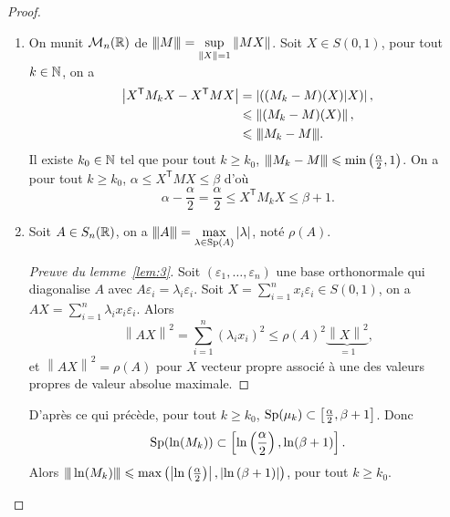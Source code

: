 \documentclass[12pt]{article}
\begin{document}
\begin{proof}
\begin{enumerate}
		\item On munit $\mathcal{M}_n(\mathbb{R})$ de ${\left\vert\kern-0.25ex\left\vert\kern-0.25ex\left\vert{}M \right\vert\kern-0.25ex\right\vert\kern-0.25ex\right\vert}=\sup\limits_{\left\lVert X\right\rVert=1}\left\lVert MX\right\rVert$. Soit $X\in S(0,1)$, pour tout $k\in\mathbb{N}$, on a 
		\begin{align}
			\left\lvert X^{\mathsf{T}}M_kX-X^{\mathsf{T}}MX\right\rvert
			&=\left\lvert\left((M_k-M)(X)|X\right)\right\rvert,\\
			&\leqslant \left\lVert (M_k-M)(X)\right\rVert,\\
			&\leqslant{\left\vert\kern-0.25ex\left\vert\kern-0.25ex\left\vert{}M_k-M \right\vert\kern-0.25ex\right\vert\kern-0.25ex\right\vert}.
		\end{align}
		Il existe $k_{0}\in\mathbb{N}$ tel que pour tout $k\geqslant k_0$, ${\left\vert\kern-0.25ex\left\vert\kern-0.25ex\left\vert{}M_k-M \right\vert\kern-0.25ex\right\vert\kern-0.25ex\right\vert}\leqslant\min\left(\frac{\alpha}{2},1\right)$. On a pour tout $k\geqslant k_0$, $\alpha\leqslant X^{\mathsf{T}}MX\leqslant \beta$ d'où 
		\begin{equation}
			\alpha-\frac{\alpha}{2}=\frac{\alpha}{2}\leqslant X^{\mathsf{T}}M_k X\leqslant \beta+1.
		\end{equation}

		\item 
		\begin{lemma}
			\label{lem:3}
			Soit $A\in S_n(\mathbb{R})$, on a ${\left\vert\kern-0.25ex\left\vert\kern-0.25ex\left\vert{}A \right\vert\kern-0.25ex\right\vert\kern-0.25ex\right\vert}=\max\limits_{\lambda\in\operatorname{Sp}(A)}\left\lvert\lambda\right\rvert$, noté $\rho(A)$.	
		\end{lemma}
		\begin{proof}[Preuve du lemme~\ref{lem:3}]
			Soit $(\varepsilon_1,\dots,\varepsilon_n)$ une base orthonormale qui diagonalise $A$ avec $A\varepsilon_{i}=\lambda_{i}\varepsilon_{i}$. Soit $X=\sum_{i=1}^{n}x_i\varepsilon_i\in S(0,1)$, on a $AX=\sum_{i=1}^{n}\lambda_i x_i\varepsilon_i$. Alors 
			\begin{equation}
				\left\lVert AX\right\rVert^{2}=\sum_{i=1}^{n}\left(\lambda_i x_i\right)^{2}\leqslant\rho(A)^{2}\underbrace{\left\lVert X\right\rVert^{2}}_{=1},
			\end{equation}
			et $\left\lVert AX\right\rVert^{2}=\rho(A)$ pour $X$ vecteur propre associé à une des valeurs propres de valeur absolue maximale.
		\end{proof}

		D'après ce qui précède, pour tout $k\geqslant k_0$, $\operatorname{Sp}(\mu_k)\subset\left[\frac{\alpha}{2},\beta+1\right]$. Donc 
		\begin{equation}
			\operatorname{Sp}(\ln(M_k))\subset\left[\ln\left(\frac{\alpha}{2}\right),\ln(\beta+1)\right].
		\end{equation}
		Alors ${\left\vert\kern-0.25ex\left\vert\kern-0.25ex\left\vert{}\ln(M_k) \right\vert\kern-0.25ex\right\vert\kern-0.25ex\right\vert}\leqslant\max\left(\left\lvert\ln\left(\frac{\alpha}{2}\right)\right\rvert,\left\lvert\ln\left(\beta+1\right)\right\rvert\right)$, pour tout $k\geqslant k_0$.


\end{enumerate}
\end{proof}
\end{document}
